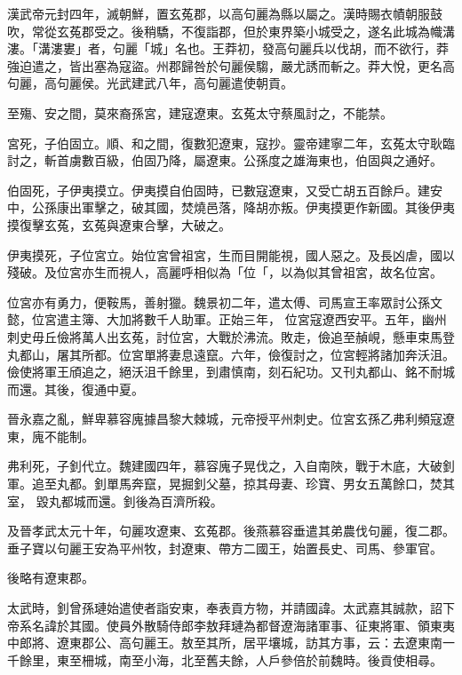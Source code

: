 \begin{pinyinscope}
 漢武帝元封四年，滅朝鮮，置玄菟郡，以高句麗為縣以屬之。漢時賜衣幘朝服鼓吹，常從玄菟郡受之。後稍驕，不復詣郡，但於東界築小城受之，遂名此城為幟溝漊。「溝漊婁」者，句麗「城」名也。王莽初，發高句麗兵以伐胡，而不欲行，莽強迫遣之，皆出塞為寇盜。州郡歸咎於句麗侯騶，嚴尤誘而斬之。莽大悅，更名高句麗，高句麗侯。光武建武八年，高句麗遣使朝貢。



 至殤、安之間，莫來裔孫宮，建寇遼東。玄菟太守蔡風討之，不能禁。



 宮死，子伯固立。順、和之間，復數犯遼東，寇抄。靈帝建寧二年，玄菟太守耿臨
 討之，斬首虜數百級，伯固乃降，屬遼東。公孫度之雄海東也，伯固與之通好。



 伯固死，子伊夷摸立。伊夷摸自伯固時，已數寇遼東，又受亡胡五百餘戶。建安中，公孫康出軍擊之，破其國，焚燒邑落，降胡亦叛。伊夷摸更作新國。其後伊夷摸復擊玄菟，玄菟與遼東合擊，大破之。



 伊夷摸死，子位宮立。始位宮曾祖宮，生而目開能視，國人惡之。及長凶虐，國以殘破。及位宮亦生而視人，高麗呼相似為「位「，以為似其曾祖宮，故名位宮。



 位宮亦有勇力，便鞍馬，善射獵。魏景初二年，遣太傅、司馬宣王率眾討公孫文懿，位宮遣主簿、大加將數千人助軍。正始三年，
 位宮寇遼西安平。五年，幽州刺史毋丘儉將萬人出玄菟，討位宮，大戰於沸流。敗走，儉追至赬峴，懸車束馬登丸都山，屠其所都。位宮單將妻息遠竄。六年，儉復討之，位宮輕將諸加奔沃沮。儉使將軍王頎追之，絕沃沮千餘里，到肅慎南，刻石紀功。又刊丸都山、銘不耐城而還。其後，復通中夏。



 晉永嘉之亂，鮮卑慕容廆據昌黎大棘城，元帝授平州刺史。位宮玄孫乙弗利頻寇遼東，廆不能制。



 弗利死，子釗代立。魏建國四年，慕容廆子晃伐之，入自南陜，戰于木底，大破釗軍。追至丸都。釗單馬奔竄，晃掘釗父墓，掠其母妻、珍寶、男女五萬餘口，焚其室，
 毀丸都城而還。釗後為百濟所殺。



 及晉孝武太元十年，句麗攻遼東、玄菟郡。後燕慕容垂遣其弟農伐句麗，復二郡。垂子寶以句麗王安為平州牧，封遼東、帶方二國王，始置長史、司馬、參軍官。



 後略有遼東郡。



 太武時，釗曾孫璉始遣使者詣安東，奉表貢方物，并請國諱。太武嘉其誠款，詔下帝系名諱於其國。使員外散騎侍郎李敖拜璉為都督遼海諸軍事、征東將軍、領東夷中郎將、遼東郡公、高句麗王。敖至其所，居平壤城，訪其方事，云：去遼東南一千餘里，東至柵城，南至小海，北至舊夫餘，人戶參倍於前魏時。後貢使相尋。




\end{pinyinscope}
